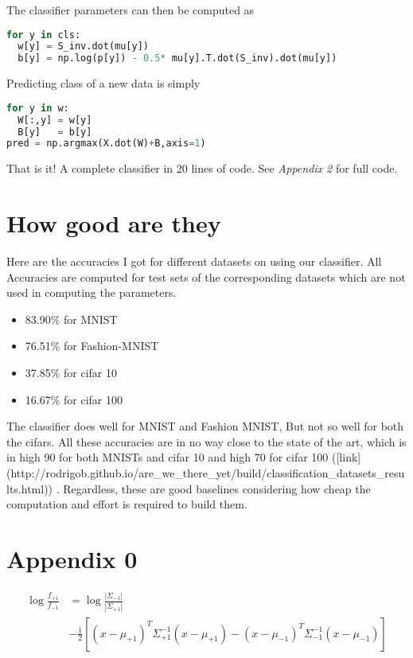 \documentclass[12pt,crop=false,class=article,convert={density=300,outext=.compiled.png}]{standalone}
\begin{document}
The classifier parameters can then be computed as
\begin{lstlisting}[language=Python]
for y in cls:
  w[y] = S_inv.dot(mu[y])
  b[y] = np.log(p[y]) - 0.5* mu[y].T.dot(S_inv).dot(mu[y]) 
\end{lstlisting}

Predicting class of a new data is simply
\begin{lstlisting}[language=Python]
for y in w:
  W[:,y] = w[y]
  B[y]   = b[y]
pred = np.argmax(X.dot(W)+B,axis=1)
\end{lstlisting}

That is it! A complete classifier in 20 lines of code. See \textit{Appendix
2} for full code.

\section*{How good are they}


Here are the accuracies I got for different datasets on using our
classifier. All Accuracies are computed for test sets of the
corresponding datasets which are not used in computing the parameters.
\begin{itemize}
    \item 83.90\% for MNIST 
    \item 76.51\% for Fashion-MNIST 
    \item 37.85\% for cifar 10 
    \item 16.67\% for cifar 100
\end{itemize}

The classifier does well for MNIST and Fashion MNIST, But not so well
for both the cifars. All these accuracies are in no way close to the
state of the art, which is in high 90 for both MNISTs and cifar 10 and
high 70 for cifar 100
([link](http://rodrigob.github.io/are\_we\_there\_yet/build/classification\_datasets\_results.html))
. Regardless, these are good baselines considering how cheap the
computation and effort is required to build them.

\section*{Appendix 0}
\begin{align*}
\log \frac{f_{+1}}{f_{-1}} &= 
\log 
    \frac{|\Sigma_{-1}|}{|\Sigma_{+1}|} 
    \\&- 
    \frac{1}{2}
        \left[
        (x-\mu_{+1})^T\Sigma_{+1}^{-1}(x-\mu_{+1}) 
        - 
        (x-\mu_{-1})^T\Sigma_{-1}^{-1}(x-\mu_{-1})  
    \right] 
\end{align*}
\end{document}
